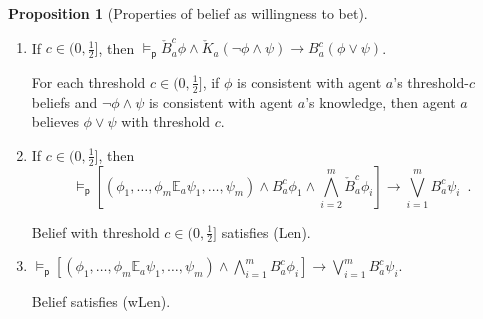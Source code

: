\documentclass[12pt]{article}
\theoremstyle{definition}
\newtheorem{proposition}[theorem]{Proposition}
\newcommand{\modelsp}{\models_{\mathsf{p}}}                  %
\begin{document}
\begin{proposition}[Properties of belief as willingness to bet]
\begin{enumerate}
    High-threshold belief is consistent: belief in $\phi$ implies
    disbelief in $\lnot\phi$.

  \item \label{item:B-SC} If $c\in(0,\frac 12]$, then $\modelsp
    \check{B}_a^c \phi \land \check{K}_a(\neg \phi \land \psi)
    \rightarrow B_a^c (\phi \lor \psi)$.
    
    For each threshold $c\in(0,\frac 12]$, if $\phi$ is consistent
    with agent $a$'s threshold-$c$ beliefs and $\lnot\phi\land\psi$ is
    consistent with agent $a$'s knowledge, then agent $a$ believes
    $\phi\lor\psi$ with threshold $c$.

  \item \label{item:B-Len} If $c\in(0,\frac 12]$, then
    \[
    \textstyle \modelsp
    [(\phi_1,\dots,\phi_m\mathbb{E}_a\psi_1,\dots,\psi_m) \land
    B_a^c\phi_1 \land \bigwedge_{i=2}^m \check B_a^c\phi_i] \to
    \bigvee_{i=1}^m B_a^c\psi_i\enspace.
    \]

    Belief with threshold $c\in(0,\frac 12]$ satisfies (Len).

  \item \label{item:B-wLen}
    $\modelsp[(\phi_1,\dots,\phi_m\mathbb{E}_a\psi_1,\dots,\psi_m) \land
    \bigwedge_{i=1}^m B_a^c\phi_i] \to \bigvee_{i=1}^m B_a^c\psi_i$.

    Belief satisfies (wLen).
  \end{enumerate}
\end{proposition}
\end{document}
